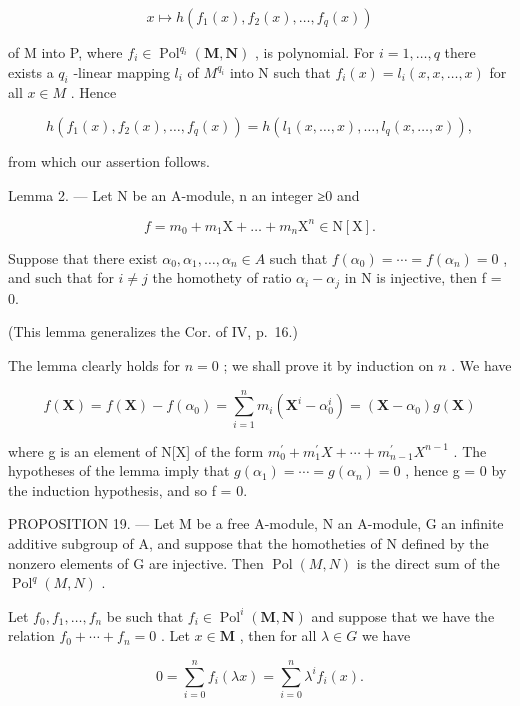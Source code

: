 \[
x \mapsto h (f _ {1} (x), f _ {2} (x), \dots , f _ {q} (x))
\]

of M into P, where \(f_{i} \in \operatorname{Pol}^{q_{i}}(\mathbf{M}, \mathbf{N})\) , is polynomial. For \(i = 1, \ldots, q\) there exists a \(q_{i}\) -linear mapping \(l_{i}\) of \(M^{q_{i}}\) into N such that \(f_{i}(x) = l_{i}(x, x, \ldots, x)\) for all \(x \in M\) . Hence

\[
h \left(f _ {1} (x), f _ {2} (x), \dots , f _ {q} (x)\right) = h \left(l _ {1} (x, \dots , x), \dots , l _ {q} (x, \dots , x)\right),
\]

from which our assertion follows.

Lemma 2. --- Let N be an A-module, n an integer ≥0 and

\[
f = m _ {0} + m _ {1} \mathrm{X} + \dots + m _ {n} \mathrm{X} ^ {n} \in \mathrm{N} [ \mathrm{X} ].
\]

Suppose that there exist \(\alpha_{0}, \alpha_{1}, \ldots, \alpha_{n} \in A\) such that \(f(\alpha_{0}) = \cdots = f(\alpha_{n}) = 0\) , and such that for \(i \neq j\) the homothety of ratio \(\alpha_{i} - \alpha_{j}\) in N is injective, then f = 0.

(This lemma generalizes the Cor. of IV, p.~16.)

The lemma clearly holds for \(n = 0\) ; we shall prove it by induction on \(n\) . We have

\[
f (\mathbf {X}) = f (\mathbf {X}) - f \left(\alpha_ {0}\right) = \sum_ {i = 1} ^ {n} m _ {i} \left(\mathbf {X} ^ {i} - \alpha_ {0} ^ {i}\right) = \left(\mathbf {X} - \alpha_ {0}\right) g (\mathbf {X})
\]

where g is an element of N{[}X{]} of the form \(m_{0}^{\prime} + m_{1}^{\prime} X + \cdots + m_{n-1}^{\prime} X^{n-1}\) . The hypotheses of the lemma imply that \(g(\alpha_{1}) = \cdots = g(\alpha_{n}) = 0\) , hence g = 0 by the induction hypothesis, and so f = 0.

PROPOSITION 19. --- Let M be a free A-module, N an A-module, G an infinite additive subgroup of A, and suppose that the homotheties of N defined by the nonzero elements of G are injective. Then \(\operatorname{Pol}(M,N)\) is the direct sum of the \(\operatorname{Pol}^{q}(M,N)\) .

Let \(f_{0}, f_{1}, \ldots, f_{n}\) be such that \(f_{i} \in \operatorname{Pol}^{i}(\mathbf{M}, \mathbf{N})\) and suppose that we have the relation \(f_{0} + \cdots + f_{n} = 0\) . Let \(x \in \mathbf{M}\) , then for all \(\lambda \in G\) we have

\[
0 = \sum_ {i = 0} ^ {n} f _ {i} (\lambda x) = \sum_ {i = 0} ^ {n} \lambda^ {i} f _ {i} (x).
\]

